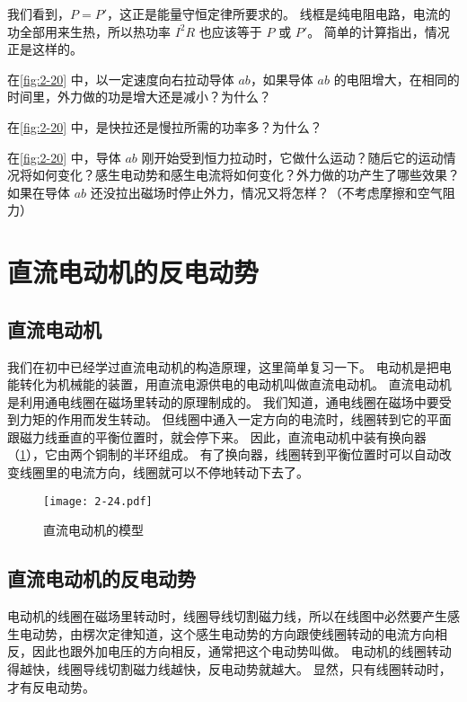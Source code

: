 我们看到，$P=P'$，这正是能量守恒定律所要求的。
线框是纯电阻电路，电流的功全部用来生热，所以热功率 $I^2R$ 也应该等于 $P$ 或 $P'$。
简单的计算指出，情况正是这样的。

\begin{Practice}
\begin{question}
    \item 在\cref{fig:2-20} 中，以一定速度向右拉动导体 $ab$，如果导体 $ab$ 的电阻增大，在相同的时间里，外力做的功是增大还是减小？为什么？
    \item 在\cref{fig:2-20} 中，是快拉还是慢拉所需的功率多？为什么？
    \item 在\cref{fig:2-20} 中，导体 $ab$ 刚开始受到恒力拉动时，它做什么运动？随后它的运动情况将如何变化？感生电动势和感生电流将如何变化？外力做的功产生了哪些效果？如果在导体 $ab$ 还没拉出磁场时停止外力，情况又将怎样？（不考虑摩擦和空气阻力）
\end{question}
\end{Practice}

\section{直流电动机的反电动势}
\subsection{直流电动机}
我们在初中已经学过直流电动机的构造原理，这里简单复习一下。
电动机是把电能转化为机械能的装置，用直流电源供电的电动机叫做直流电动机。
直流电动机是利用通电线圈在磁场里转动的原理制成的。
我们知道，通电线圈在磁场中要受到力矩的作用而发生转动。
但线圈中通入一定方向的电流时，线圈转到它的平面跟磁力线垂直的平衡位置时，就会停下来。
因此，直流电动机中装有换向器（\cref{fig:2-24}），它由两个铜制的半环组成。
有了换向器，线圈转到平衡位置时可以自动改变线圈里的电流方向，线圈就可以不停地转动下去了。
\begin{figure}
\texttt{[image: 2-24.pdf]}
\caption{直流电动机的模型}\label{fig:2-24}
\end{figure}

\subsection{直流电动机的反电动势}

电动机的线圈在磁场里转动时，线圈导线切割磁力线，所以在线图中必然要产生感生电动势，由楞次定律知道，这个感生电动势的方向跟使线圈转动的电流方向相反，因此也跟外加电压的方向相反，通常把这个电动势叫做。
电动机的线圈转动得越快，线圈导线切割磁力线越快，反电动势就越大。
显然，只有线圈转动时，才有反电动势。

